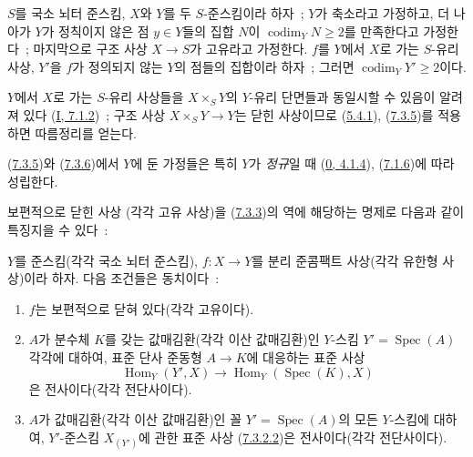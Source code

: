 \begin{corollary}[7.3.6]
\label{II.7.3.6-ko}
$S$를 국소 뇌터 준스킴, $X$와 $Y$를 두 $S$-준스킴이라 하자~; $Y$가
축소라고 가정하고, 더 나아가 $Y$가 정칙이지 않은 점 $y\in Y$들의 집합
$N$이 $\operatorname{codim}_YN\geq2$를 만족한다고 가정한다~; 마지막으로
구조 사상 $X\to S$가 고유라고 가정한다. $f$를 $Y$에서 $X$로 가는
$S$-유리 사상, $Y'$을 $f$가 정의되지 않는 $Y$의 점들의 집합이라 하자~;
그러면 $\operatorname{codim}_YY'\geq2$이다.
\end{corollary}

$Y$에서 $X$로 가는 $S$-유리 사상들을 $X\times_SY$의 $Y$-유리
단면들과 동일시할 수 있음이 알려져 있다
(\hyperref[I.7.1.2-ko]{I, 7.1.2})~; 구조 사상 $X\times_SY\to Y$는 닫힌
사상이므로 (\hyperref[II.5.4.1-ko]{5.4.1}),
(\hyperref[II.7.3.5-ko]{7.3.5})를 적용하면 따름정리를 얻는다.

\begin{remark}[7.3.7]
\label{II.7.3.7-ko}
(\hyperref[II.7.3.5-ko]{7.3.5})와
(\hyperref[II.7.3.6-ko]{7.3.6})에서 $Y$에 둔 가정들은 특히 $Y$가
\emph{정규}일 때 (\hyperref[0.4.1.4-ko]{0, 4.1.4}),
(\hyperref[II.7.1.6-ko]{7.1.6})에 따라 성립한다.
\end{remark}

보편적으로 닫힌 사상 (각각 고유 사상)을
(\hyperref[II.7.3.3-ko]{7.3.3})의 역에 해당하는 명제로 다음과 같이
특징지을 수 있다~:

\begin{theorem}[7.3.8]
\label{II.7.3.8-ko}
$Y$를 준스킴(각각 국소 뇌터 준스킴), $f:X\to Y$를 분리 준콤팩트
사상(각각 유한형 사상)이라 하자. 다음 조건들은 동치이다~:
\begin{enumerate}
\item[\rm a)] $f$는 보편적으로 닫혀 있다(각각 고유이다).
\item[\rm b)] $A$가 분수체 $K$를 갖는 값매김환(각각 이산 값매김환)인
$Y$-스킴 $Y'=\operatorname{Spec}(A)$ 각각에 대하여, 표준 단사 준동형
$A\to K$에 대응하는 표준 사상
\[
\operatorname{Hom}_Y(Y',X)\longrightarrow
\operatorname{Hom}_Y(\operatorname{Spec}(K),X)
\]
은 전사이다(각각 전단사이다).
\item[\rm c)] $A$가 값매김환(각각 이산 값매김환)인 꼴
$Y'=\operatorname{Spec}(A)$의 모든 $Y$-스킴에 대하여, $Y'$-준스킴
$X_{(Y')}$에 관한 표준 사상
(\hyperref[II.7.3.2.2-ko]{7.3.2.2})은 전사이다(각각 전단사이다).
\end{enumerate}
\end{theorem}

